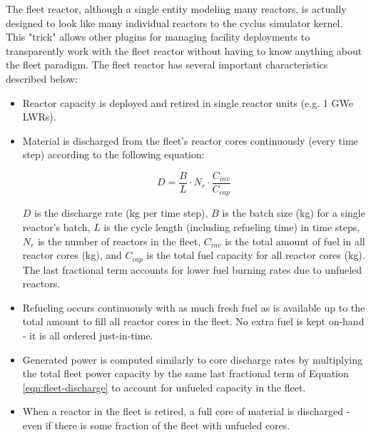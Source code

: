 \documentclass{style}
\begin{document}
The fleet reactor, although a single entity modeling many reactors, is
actually designed to look like many individual reactors to the cyclus
simulator kernel. This "trick" allows other plugins for managing facility
deployments to transparently work with the fleet reactor without having to
know anything about the fleet paradigm.  The fleet reactor has several
important characteristics described below:

\begin{itemize}

    \item Reactor capacity is deployed and retired in single reactor units
        (e.g. 1 GWe LWRs).

    \item Material is discharged from the fleet's reactor cores continuously
        (every time step) according to the following equation:

        \begin{equation}
            D =
            \frac{B}{L} \cdot N_{r} \cdot \frac{C_{inv}}{C_{cap}}
            \label{eqn:fleet-discharge}
        \end{equation}

        $D$ is the discharge rate (kg per time step), $B$ is the batch size
        (kg) for a single reactor's batch, $L$ is the cycle length (including
        refueling time) in time steps, $N_{r}$ is the number of reactors in
        the fleet, $C_{inv}$ is the total amount of fuel in all reactor cores
        (kg), and $C_{cap}$ is the total fuel capacity for all reactor cores
        (kg).  The last fractional term accounts for lower fuel burning rates
        due to unfueled reactors.

    \item Refueling occurs continuously with as much fresh fuel as is
        available up to the total amount to fill all reactor cores in the
        fleet.  No extra fuel is kept on-hand - it is all ordered
        just-in-time.

    \item Generated power is computed similarly to core discharge rates by
        multiplying the total fleet power capacity by the same last fractional
        term of Equation \ref{eqn:fleet-discharge} to account for unfueled
        capacity in the fleet.

    \item When a reactor in the fleet is retired, a full core of material is
        discharged - even if there is some fraction of the fleet with unfueled
        cores.
        
\end{itemize}
\end{document}
